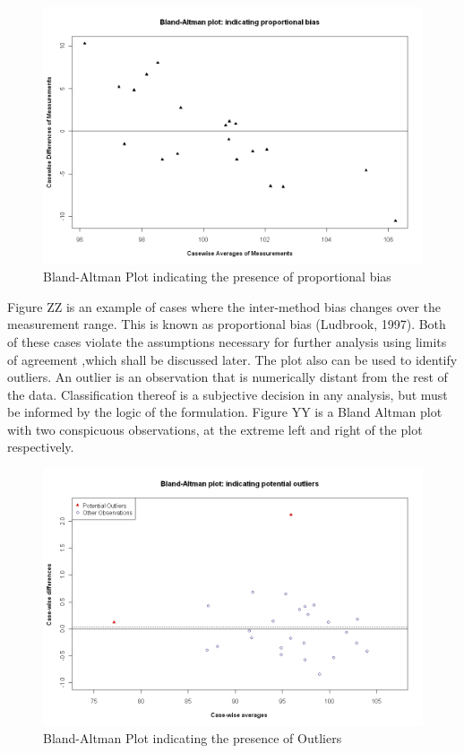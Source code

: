 \documentclass[12pt, a4paper]{report}
\begin{document}
\begin{figure}[h!]
\begin{center}
  \includegraphics[width=125mm]{PropBias.jpeg}
  \caption{Bland-Altman Plot indicating the presence of proportional bias}\label{PropBias}
\end{center}
\end{figure}

\newpage
Figure ZZ is an example of cases where the inter-method bias changes over the measurement range. This is known as proportional
bias (Ludbrook, 1997). Both of these cases violate the assumptions necessary for further analysis using limits of agreement ,which
shall be discussed later. The plot also can be used to identify outliers. An outlier is an observation that is numerically distant
from the rest of the data. Classification thereof is a subjective decision in any analysis, but must be informed by the logic of the
formulation. Figure YY is a Bland Altman plot with two conspicuous observations, at the extreme left and right of the plot
respectively.


\begin{figure}[h!]
\begin{center}
  \includegraphics[width=125mm]{BAOutliers.jpeg}
  \caption{Bland-Altman Plot indicating the presence of Outliers}\label{PropBias}
\end{center}
\end{figure}
\end{document}
